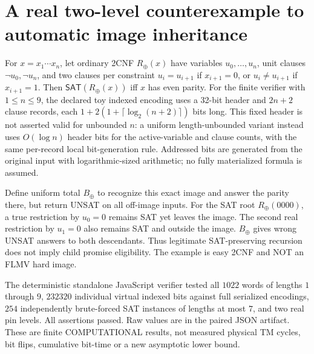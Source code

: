 \documentclass[11pt]{article}
\newcommand{\SAT}{\mathsf{SAT}}
\begin{document}
\section{A real two-level counterexample to automatic image inheritance}
For $x=x_1\cdots x_n$, let ordinary 2CNF $R_\oplus(x)$ have variables
$u_0,\ldots,u_n$, unit clauses $\neg u_0,\neg u_n$, and two clauses per
constraint $u_i=u_{i+1}$ if $x_{i+1}=0$, or
$u_i\ne u_{i+1}$ if $x_{i+1}=1$.
Then $\SAT(R_\oplus(x))$ iff $x$ has even parity.
For the finite verifier with $1\le n\le9$, the declared toy indexed
encoding uses a 32-bit header and $2n+2$ clause records, each
$1+2(1+\lceil\log_2(n+2)\rceil)$ bits long. This fixed header is
not asserted valid for unbounded $n$: a uniform length-unbounded variant
instead uses $O(\log n)$ header bits for the active-variable and clause
counts, with the same per-record local bit-generation rule. Addressed bits
are generated from the original input with logarithmic-sized arithmetic;
no fully materialized formula is assumed.

Define uniform total $B_\oplus$ to recognize this exact image and
answer the parity there, but return UNSAT on all off-image inputs.
For the SAT root $R_\oplus(0000)$, a true restriction by $u_0=0$
remains SAT yet leaves the image. The second real restriction by
$u_1=0$ also remains SAT and outside the image. $B_\oplus$ gives
wrong UNSAT answers to both descendants. Thus legitimate SAT-preserving
recursion does not imply child promise eligibility. The example is
easy 2CNF and NOT an FLMV hard image.

The deterministic standalone JavaScript verifier
tested all $1022$ words of lengths $1$ through $9$,
$232320$ individual virtual indexed bits against full serialized
encodings, $254$ independently brute-forced SAT instances of lengths
at most $7$, and two real pin levels. All assertions passed.
Raw values are in the paired JSON artifact. These are finite
COMPUTATIONAL results, not measured physical TM cycles, bit flips,
cumulative bit-time or a new asymptotic lower bound.
\end{document}
